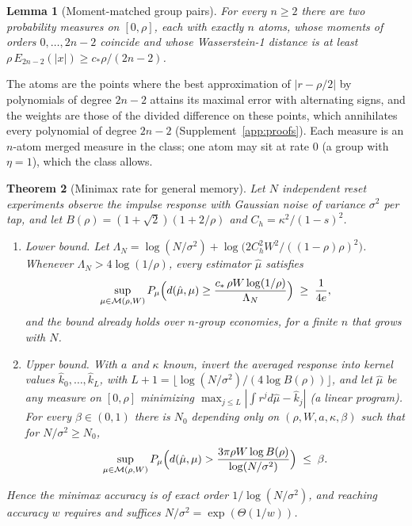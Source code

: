 \documentclass[12pt]{article}
\newtheorem{theorem}{Theorem}[section]
\newtheorem{lemma}[theorem]{Lemma}
\theoremstyle{definition}
\theoremstyle{remark}
\begin{document}
\begin{lemma}[Moment-matched group pairs]\label{lem:altpair}
For every $n\ge2$ there are two probability measures on $[0,\rho]$, each with exactly $n$ atoms, whose moments of orders $0,\ldots,2n-2$ coincide and whose Wasserstein-1 distance is at least $\rho\,E_{2n-2}(|x|)\ge c_*\rho/(2n-2)$.
\end{lemma}

The atoms are the points where the best approximation of $|r-\rho/2|$ by polynomials of degree $2n-2$ attains its maximal error with alternating signs, and the weights are those of the divided difference on these points, which annihilates every polynomial of degree $2n-2$ (Supplement~\ref{app:proofs}). Each measure is an $n$-atom merged measure in the class; one atom may sit at rate $0$ (a group with $\eta=1$), which the class allows.

\begin{theorem}[Minimax rate for general memory]\label{thm:general}
Let $N$ independent reset experiments observe the impulse response with Gaussian noise of variance $\sigma^2$ per tap, and let $B(\rho)=(1+\sqrt2)(1+2/\rho)$ and $C_h=\kappa^2/(1-s)^2$.
\begin{enumerate}[label=(\roman*)]
\item \emph{Lower bound.} Let $\Lambda_N=\log(N/\sigma^2)+\log\bigl(2C_h^2W^2/((1-\rho)\rho)^2\bigr)$. Whenever $\Lambda_N>4\log(1/\rho)$, every estimator $\hat\mu$ satisfies
\[
\sup_{\mu\in\mathcal M(\rho,W)}P_\mu\Bigl(d(\hat\mu,\mu)\ge\frac{c_*\,\rho W\log(1/\rho)}{\Lambda_N}\Bigr)\;\ge\;\frac1{4e},
\]
and the bound already holds over $n$-group economies, for a finite $n$ that grows with $N$.
\item \emph{Upper bound.} With $a$ and $\kappa$ known, invert the averaged response into kernel values $\hat k_0,\ldots,\hat k_L$, with $L+1=\lfloor\log(N/\sigma^2)/(4\log B(\rho))\rfloor$, and let $\hat\mu$ be any measure on $[0,\rho]$ minimizing $\max_{j\le L}|\int r^jd\hat\mu-\hat k_j|$ (a linear program). For every $\beta\in(0,1)$ there is $N_0$ depending only on $(\rho,W,a,\kappa,\beta)$ such that for $N/\sigma^2\ge N_0$,
\[
\sup_{\mu\in\mathcal M(\rho,W)}P_\mu\Bigl(d(\hat\mu,\mu)>\frac{3\pi\rho W\log B(\rho)}{\log(N/\sigma^2)}\Bigr)\;\le\;\beta .
\]
\end{enumerate}
Hence the minimax accuracy is of exact order $1/\log(N/\sigma^2)$, and reaching accuracy $w$ requires and suffices $N/\sigma^2=\exp(\Theta(1/w))$.
\end{theorem}
\end{document}
